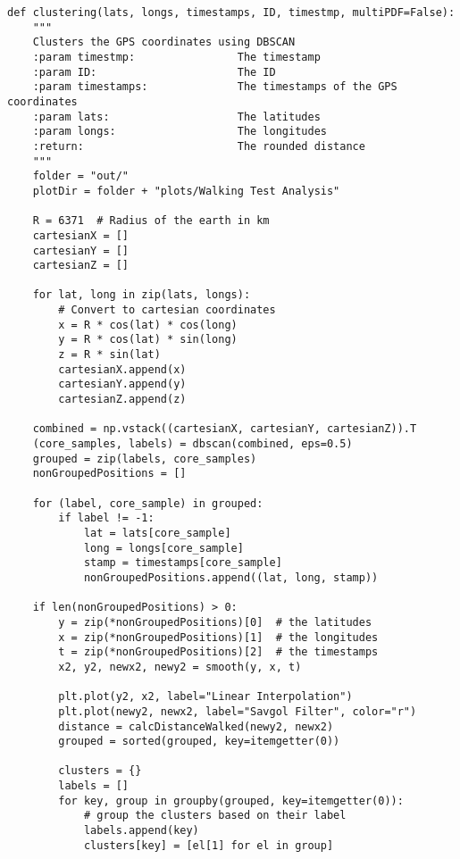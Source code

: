 \begin{verbatim}
def clustering(lats, longs, timestamps, ID, timestmp, multiPDF=False):
    """
    Clusters the GPS coordinates using DBSCAN
    :param timestmp:                The timestamp
    :param ID:                      The ID
    :param timestamps:              The timestamps of the GPS coordinates
    :param lats:                    The latitudes
    :param longs:                   The longitudes
    :return:                        The rounded distance
    """
    folder = "out/"
    plotDir = folder + "plots/Walking Test Analysis"

    R = 6371  # Radius of the earth in km
    cartesianX = []
    cartesianY = []
    cartesianZ = []

    for lat, long in zip(lats, longs):
        # Convert to cartesian coordinates
        x = R * cos(lat) * cos(long)
        y = R * cos(lat) * sin(long)
        z = R * sin(lat)
        cartesianX.append(x)
        cartesianY.append(y)
        cartesianZ.append(z)

    combined = np.vstack((cartesianX, cartesianY, cartesianZ)).T
    (core_samples, labels) = dbscan(combined, eps=0.5)
    grouped = zip(labels, core_samples)
    nonGroupedPositions = []

    for (label, core_sample) in grouped:
        if label != -1:
            lat = lats[core_sample]
            long = longs[core_sample]
            stamp = timestamps[core_sample]
            nonGroupedPositions.append((lat, long, stamp))

    if len(nonGroupedPositions) > 0:
        y = zip(*nonGroupedPositions)[0]  # the latitudes
        x = zip(*nonGroupedPositions)[1]  # the longitudes
        t = zip(*nonGroupedPositions)[2]  # the timestamps
        x2, y2, newx2, newy2 = smooth(y, x, t)

        plt.plot(y2, x2, label="Linear Interpolation")
        plt.plot(newy2, newx2, label="Savgol Filter", color="r")
        distance = calcDistanceWalked(newy2, newx2)
        grouped = sorted(grouped, key=itemgetter(0))

        clusters = {}
        labels = []
        for key, group in groupby(grouped, key=itemgetter(0)):
            # group the clusters based on their label
            labels.append(key)
            clusters[key] = [el[1] for el in group]


\end{verbatim}
